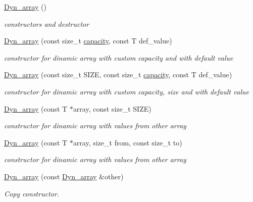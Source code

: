 \begin{DoxyCompactItemize}
\item 
\hyperlink{classDyn__array_a3afc99260021fc0a0861c7a6dffa7dcb}{Dyn\+\_\+array} ()
\begin{DoxyCompactList}\small\item\em constructors and destructor \end{DoxyCompactList}\item 
\hyperlink{classDyn__array_a25117136ea5c69b0bee57d5c12b481b9}{Dyn\+\_\+array} (const size\+\_\+t \hyperlink{classDyn__array_a36c5289ec13ee40366fe3b095b2347bf}{capacity}, const T def\+\_\+value)
\begin{DoxyCompactList}\small\item\em constructor for dinamic array with custom capacity and with default value \end{DoxyCompactList}\item 
\hyperlink{classDyn__array_ab65231e8b87c5fbb58f22fb8a1d18ee3}{Dyn\+\_\+array} (const size\+\_\+t S\+I\+ZE, const size\+\_\+t \hyperlink{classDyn__array_a36c5289ec13ee40366fe3b095b2347bf}{capacity}, const T def\+\_\+value)
\begin{DoxyCompactList}\small\item\em constructor for dinamic array with custom capacity, size and with default value \end{DoxyCompactList}\item 
\hyperlink{classDyn__array_a732dc944171bd9abbf0086af367e3202}{Dyn\+\_\+array} (const T $\ast$array, const size\+\_\+t S\+I\+ZE)
\begin{DoxyCompactList}\small\item\em constructor for dinamic array with values from other array \end{DoxyCompactList}\item 
\hyperlink{classDyn__array_a7fa28275bd20add3643eeab60e06a431}{Dyn\+\_\+array} (const T $\ast$array, size\+\_\+t from, const size\+\_\+t to)
\begin{DoxyCompactList}\small\item\em constructor for dinamic array with values from other array \end{DoxyCompactList}\item 
\hyperlink{classDyn__array_a83d19f61fc7cef07e8125911729fd3bf}{Dyn\+\_\+array} (const \hyperlink{classDyn__array}{Dyn\+\_\+array} \&other)
\begin{DoxyCompactList}\small\item\em Copy constructor. \end{DoxyCompactList}\item 

\end{DoxyCompactItemize}
